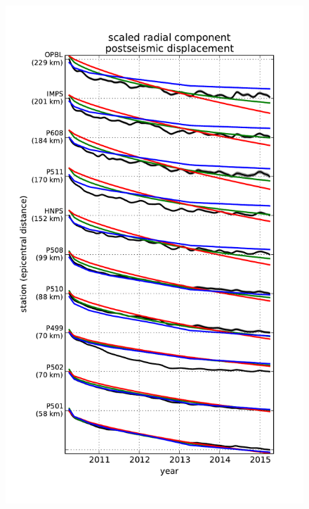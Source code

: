 \documentclass[12pt]{article}
\begin{document}
\begin{figure}
\includegraphics[scale=0.9]{Figures/near_field_final_record_section}
\centering 
\caption{}
\label{fig:FinalNearFieldRS}
\end{figure} 
\end{document}
